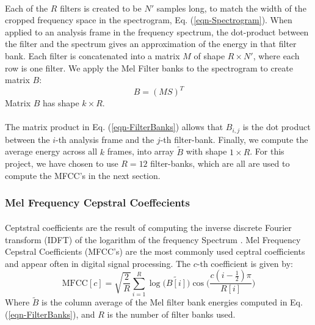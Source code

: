 \documentclass[12pt,letterpaper]{article}
\begin{document}
\paragraph*{}Each of the $R$ filters is created to be $N'$ samples long, to match the width of the cropped frequency space in the spectrogram, Eq. (\ref{eqn-Spectrogram}). When applied to an analysis frame in the frequency spectrum, the dot-product between the filter and the spectrum gives an approximation of the energy in that filter bank. Each filter is concatenated into a matrix $M$ of shape $R \times N'$, where each row is one filter. We apply the Mel Filter banks to the spectrogram to create matrix $B$:
\begin{equation}
\label{eqn-FilterBanks}
B = (MS)^T
\end{equation}
Matrix $B$ has shape $k \times R$.

\paragraph*{}The matrix product in Eq. (\ref{eqn-FilterBanks}) allows that $B_{i,j}$ is the dot product between the $i$-th analysis frame and the $j$-th filter-bank. Finally, we compute the average energy across all $k$ frames, into array $\widetilde{B}$ with shape $1 \times R$. For this project, we have chosen to use $R = 12$ filter-banks, which are all are used to compute the MFCC's in the next section.


\subsubsection{Mel Frequency Cepstral Coeffecients}

\paragraph*{}Ceptstral coefficients are the result of computing the inverse discrete Fourier transform (IDFT) of the logarithm of the frequency Spectrum \cite{Serizel,Sahidullah}. Mel Frequency Cepstral Coefficients (MFCC's) are the most commonly used ceptral coefficients and appear often in digital signal processing. The $c$-th coefficient is given by:
\begin{equation}
\label{feat-MFCC}
\text{MFCC}[c] = \sqrt{\frac{2}{R}} \sum_{i=1}^{R} 
\log\big(\widetilde{B[i]}\big) \cos\bigg(\frac{c(i-\frac{1}{2})\pi}{R[i]}\bigg)
\end{equation}
Where $\widetilde{B}$ is the column average of the Mel filter bank energies computed in Eq. (\ref{eqn-FilterBanks}), and $R$ is the number of filter banks used.
\end{document}
